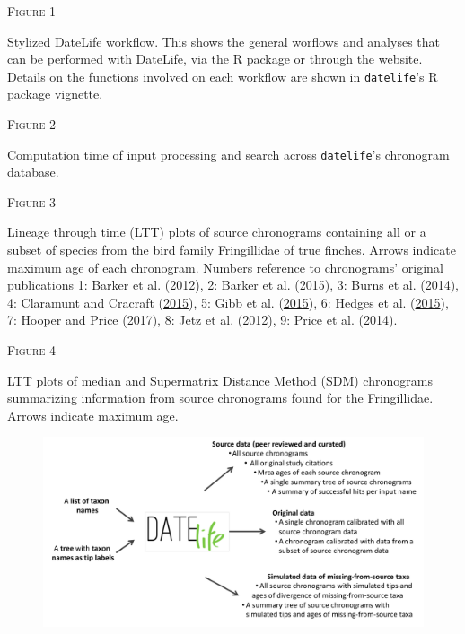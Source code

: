\newpage

\begin{center}
\textsc{Figure 1}
\end{center}
Stylized DateLife workflow. This shows the general worflows and analyses that can be performed with DateLife, via the R package or through the website. Details on the functions involved on each workflow are shown in \texttt{datelife}'s R package vignette.

\begin{center}
\textsc{Figure 2}
\end{center}
Computation time of input processing and search across \texttt{datelife}'s chronogram database.

\begin{center}
\textsc{Figure 3}
\end{center}
Lineage through time (LTT) plots of source chronograms containing all or a subset of species from the bird family Fringillidae of true finches. Arrows indicate maximum age of each chronogram. Numbers reference to chronograms' original publications 1: Barker et al. (\protect\hyperlink{ref-barker2012going}{2012}), 2: Barker et al. (\protect\hyperlink{ref-barker2015new}{2015}), 3: Burns et al. (\protect\hyperlink{ref-burns2014phylogenetics}{2014}), 4: Claramunt and Cracraft (\protect\hyperlink{ref-claramunt2015new}{2015}), 5: Gibb et al. (\protect\hyperlink{ref-gibb2015new}{2015}), 6: Hedges et al. (\protect\hyperlink{ref-Hedges2015}{2015}), 7: Hooper and Price (\protect\hyperlink{ref-hooper2017chromosomal}{2017}), 8: Jetz et al. (\protect\hyperlink{ref-Jetz2012}{2012}), 9: Price et al. (\protect\hyperlink{ref-price2014niche}{2014}).

\begin{center}
\textsc{Figure 4}
\end{center}
LTT plots of median and Supermatrix Distance Method (SDM) chronograms summarizing information from source chronograms found for the Fringillidae. Arrows indicate maximum age.

\newpage

\begin{figure}[!h]
\includegraphics{Fig1.pdf}
\caption{}
\label{fig:workflow}
\end{figure}

